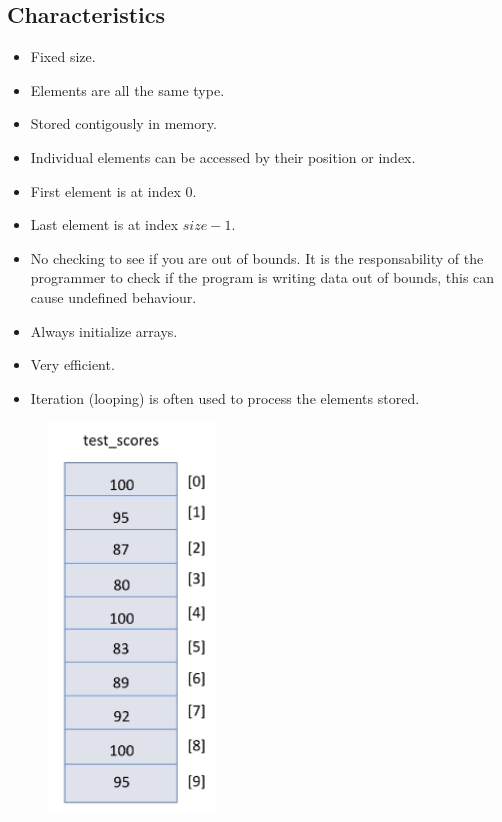 \subsection{Characteristics}
\begin{itemize}
    \item Fixed size. 
    \item Elements are all the same type.
    \item Stored contigously in memory.
    \item Individual elements can be accessed by their position or index.
    \item First element is at index 0.
    \item Last element is at index $size-1$.
    \item No checking to see if you are out of bounds. It is the responsability of the programmer to check if the program is writing data out of bounds, this can cause undefined behaviour.
    \item Always initialize arrays.
    \item Very efficient.
    \item Iteration (looping) is often used to process the elements stored.
\end{itemize}
\begin{figure}[H]
    \centering
    \includegraphics[width=0.4\textwidth]{./figs/arrays.png}
\end{figure}


